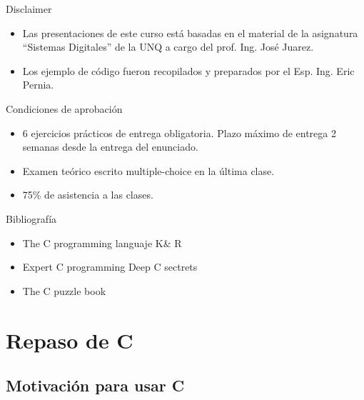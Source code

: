 \documentclass[aspectratio=169]{beamer}
\begin{document}
\begin{frame}{Disclaimer}
	\begin{itemize}
		\item Las presentaciones de este curso está basadas en el material de la asignatura ``Sistemas Digitales'' de la UNQ a cargo del prof. Ing. José Juarez.
		\vspace{10px}
		\item Los ejemplo de código fueron recopilados y preparados por el Esp. Ing. Eric Pernia.
	\end{itemize}
\end{frame}

\begin{frame}{Condiciones de aprobación}
	\begin{itemize}
		\item 6 ejercicios prácticos de entrega obligatoria.  Plazo máximo de entrega 2 semanas desde la entrega del enunciado.
		\vspace{10px}
		\item Examen teórico escrito multiple-choice en la última clase.
  	\vspace{10px}
		\item 75\% de asistencia a las clases.
	\end{itemize}
\end{frame}

\begin{frame}{Bibliografía}
	\begin{itemize}
		\item The C programming languaje K\& R
		\vspace{10px}
		\item Expert C programming \- Deep C sectrets
  	\vspace{10px}
		\item The C puzzle book
	\end{itemize}
\end{frame}



\section{Repaso de C}

\subsection{Motivación para usar C}
\end{document}

